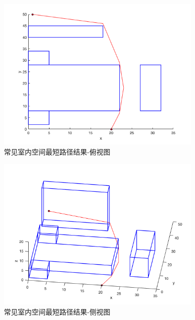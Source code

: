 \begin{figure}[htb]
    \centering
    \caption{常见室内空间最短路径结果-俯视图}
    \label{fig:test_common_situation_out_top}
    \includegraphics[width=10cm]{figures/test_common_situation_out_top.png}
\end{figure}
\begin{figure}[htb]
    \centering
    \caption{常见室内空间最短路径结果-侧视图}
    \label{fig:test_common_situation_out_lean}
    \includegraphics[width=10cm]{figures/test_common_situation_out_lean.png}
\end{figure}

